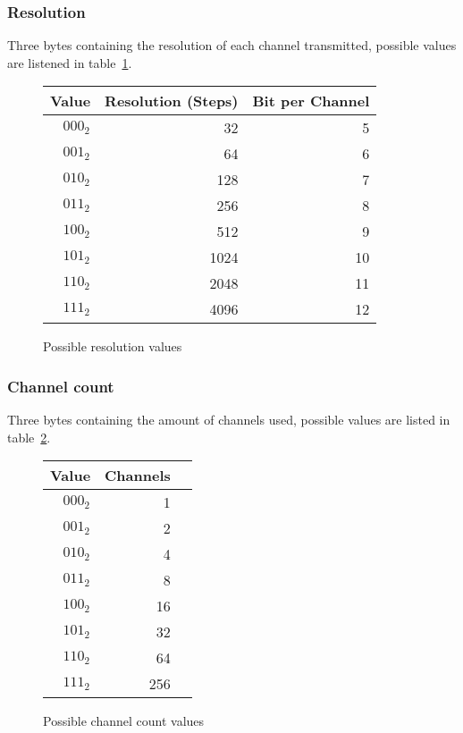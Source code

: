 \documentclass{scrreprt}
\begin{document}
\subsubsection{Resolution}
Three bytes containing the resolution of each channel transmitted, possible
values are listened in table~\ref{fig:resValues}.
\begin{figure}
   \centering
   \begin{tabular}{rrr}
     \toprule
     Value & Resolution (Steps) &	Bit per Channel \\
     \midrule
     $000_2$ & 32 & 5 \\
     $001_2$ & 64 & 6 \\
     $010_2$ & 128 & 7 \\
     $011_2$ & 256 & 8 \\
     $100_2$ & 512 & 9 \\
     $101_2$ & 1024 & 10 \\
     $110_2$ & 2048 & 11\\
     $111_2$ & 4096 & 12 \\
     \bottomrule
   \end{tabular}
   \caption{Possible resolution values}
   \label{fig:resValues}
\end{figure}


\subsubsection{Channel count}
Three bytes containing the amount of channels used, possible values are
listed in table~\ref{fig:channelValues}.

\begin{figure}[H]
   \centering
   \begin{tabular}{rrr}
     \toprule
     Value & Channels \\
     \midrule
     $000_2$ & 1 \\
     $001_2$ & 2 \\
     $010_2$ & 4 \\
     $011_2$ & 8 \\
     $100_2$ & 16 \\
     $101_2$ & 32 \\
     $110_2$ & 64 \\
     $111_2$ & 256 \\
     \bottomrule
   \end{tabular}
   \caption{Possible channel count values}
   \label{fig:channelValues}
\end{figure}
\end{document}
